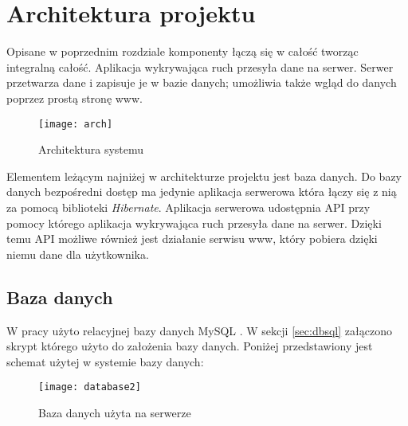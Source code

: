 \chapter{Architektura projektu}

Opisane w poprzednim rozdziale komponenty łączą się w całość tworząc integralną całość. Aplikacja wykrywająca ruch przesyła dane na serwer. Serwer przetwarza dane i zapisuje je w bazie danych; umożliwia także wgląd do danych poprzez prostą stronę www. 

\begin{figure}[h]
		\centering
		\texttt{[image: arch]}
		\caption{Architektura systemu}
		\label{fig:arch}
	\end{figure}
	
Elementem leżącym najniżej w architekturze projektu jest baza danych. Do bazy danych bezpośredni dostęp ma jedynie aplikacja serwerowa która łączy się z nią za pomocą biblioteki {\it Hibernate}. Aplikacja serwerowa udostępnia API przy pomocy którego aplikacja wykrywająca ruch przesyła dane na serwer. Dzięki temu API możliwe również jest działanie serwisu www, który pobiera dzięki niemu dane dla użytkownika. 
	
	
\section{Baza danych}
\label{sec:mysql2}

W pracy użyto relacyjnej bazy danych MySQL \cite{Mysql}. W sekcji \ref{sec:dbsql} załączono skrypt którego użyto do założenia bazy danych. Poniżej przedstawiony jest schemat użytej w systemie bazy danych:

	\begin{figure}[p]
		\centering
		\texttt{[image: database2]}
		\caption{Baza danych użyta na serwerze}
		\label{fig:database}
	\end{figure}

\FloatBarrier

